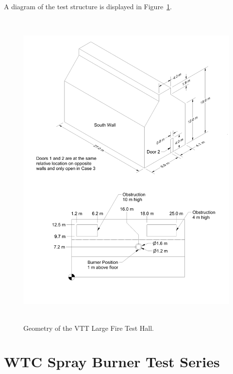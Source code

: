 A diagram of the test structure is displayed in Figure~\ref{VTT_Drawing}.
\begin{figure}
\begin{center}
\includegraphics[height=6.5in]{FIGURES/VTT/VTT_Drawing}
\end{center}
\caption[Geometry of the VTT Large Fire Test Hall]{Geometry of the VTT Large Fire Test Hall.}
\label{VTT_Drawing}
\end{figure}


\clearpage





\section{WTC Spray Burner Test Series}

